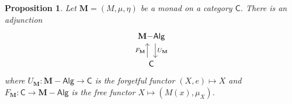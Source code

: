 \documentclass{article}
\newtheorem{prop}{Proposition}
\theoremstyle{definition}
\newcommand{\C}{\mathsf{C}}
\newcommand{\M}{\mathbf{M}}
\newcommand{\Alg}{\mathsf{Alg}}
\begin{document}
\begin{prop}\label{prop:EM-adjunction}
Let $\M = (M,\mu,\eta)$ be a monad on a category $\C$. There is an adjunction
\[\begin{tikzcd}[ampersand replacement=\&]
	{\M{-}\Alg} \\
	\C
	\arrow["{U_{\M}}", shift left=2, from=1-1, to=2-1]
	\arrow["{F_{\M}}", shift left=2, from=2-1, to=1-1]
\end{tikzcd}\]
where $U_{\M} : \M{-}\Alg \to \C$ is the forgetful functor $(X,e) \mapsto X$ and $F_{\M} : \C \to \M{-}\Alg$ is the free functor $X \mapsto (M(x), \mu_X)$.
\end{prop}
\end{document}
